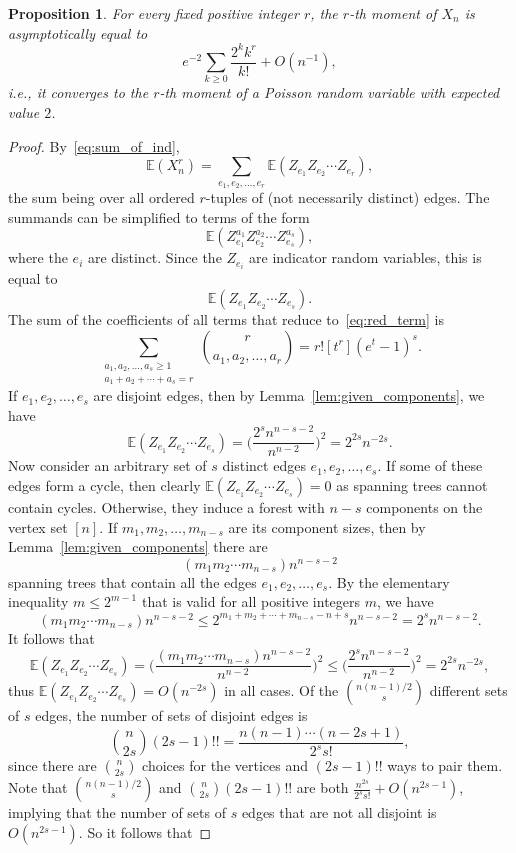 \documentclass[a4paper,12pt,reqno]{amsart}
\newtheorem{proposition}[lemma]{Proposition}
\theoremstyle{remark}
\newcommand{\Ex}{\mathbb{E}}
\begin{document}
\begin{proposition}\label{prop:moments}
For every fixed positive integer $r$, the $r$-th moment of $X_n$ is asymptotically equal to
\[e^{-2} \sum_{k \geq 0} \frac{2^k k^r}{k!} + O(n^{-1}),\]
i.e., it converges to the $r$-th moment of a Poisson random variable with expected value $2$.
\end{proposition}

\begin{proof}
By~\eqref{eq:sum_of_ind},
\[\Ex(X_n^r) = \sum_{e_1,e_2,\ldots,e_r}  \Ex(Z_{e_1}Z_{e_2} \cdots Z_{e_r}),\]
the sum being over all ordered $r$-tuples of (not necessarily distinct) edges. The summands can be simplified to terms of the form
\[\Ex(Z_{e_1}^{a_1} Z_{e_2}^{a_2} \cdots Z_{e_s}^{a_s}),\]
where the $e_i$ are distinct. Since the $Z_{e_i}$ are indicator random variables, this is equal to
\begin{equation}\label{eq:red_term}
\Ex(Z_{e_1}Z_{e_2}\cdots Z_{e_s}).
\end{equation}
The sum of the coefficients of all terms that reduce to~\eqref{eq:red_term} is
\[\sum_{\substack{a_1,a_2,\ldots,a_s \geq 1 \\ a_1 + a_2 + \cdots + a_s = r}} \binom{r}{a_1,a_2,\ldots,a_r}
= r! [t^r] (e^t-1)^s.\]
If $e_1,e_2,\ldots,e_s$ are disjoint edges, then by Lemma~\ref{lem:given_components}, we have
\[\Ex(Z_{e_1}Z_{e_2}\cdots Z_{e_s}) = \Big(\frac{2^s n^{n-s-2}}{n^{n-2}}\Big)^2 = 2^{2s} n^{-2s}.\]
Now consider an arbitrary set of $s$ distinct edges $e_1,e_2,\ldots,e_s$. If some of these edges form a cycle, then clearly $\Ex(Z_{e_1}Z_{e_2}\cdots Z_{e_s}) = 0$ as spanning trees cannot contain cycles. Otherwise, they induce a forest with $n-s$ components on the vertex set $[n]$. If $m_1,m_2,\ldots,m_{n-s}$ are its component sizes, then by Lemma~\ref{lem:given_components} there are
\[(m_1m_2\cdots m_{n-s})n^{n-s-2}\]
spanning trees that contain all the edges $e_1,e_2,\ldots,e_s$. By the elementary inequality $m \leq 2^{m-1}$ that is valid for all positive integers $m$, we have
\[(m_1m_2\cdots m_{n-s})n^{n-s-2} \leq 2^{m_1+m_2+\cdots+m_{n-s}-n+s} n^{n-s-2} = 2^s n^{n-s-2}.\]
It follows that
\[\Ex(Z_{e_1}Z_{e_2}\cdots Z_{e_s}) = 
\Big(\frac{(m_1m_2\cdots m_{n-s})n^{n-s-2}}{n^{n-2}}\Big)^2
\leq \Big(\frac{2^s n^{n-s-2}}{n^{n-2}}\Big)^2 = 2^{2s} n^{-2s},\]
thus $\Ex(Z_{e_1}Z_{e_2}\cdots Z_{e_s}) = O(n^{-2s})$ in all cases.
Of the $\binom{n(n-1)/2}{s}$ different sets of $s$ edges, the number of sets of disjoint edges is
\[\binom{n}{2s} (2s-1)!! = \frac{n(n-1)\cdots (n-2s+1)}{2^s s!},\]
since there are $\binom{n}{2s}$ choices for the vertices and $(2s-1)!!$ ways to pair them. Note that $\binom{n(n-1)/2}{s}$ and $\binom{n}{2s} (2s-1)!!$ are both $\frac{n^{2s}}{2^s s!} + O(n^{2s-1})$, implying that the number of sets of $s$ edges that are not all disjoint is $O(n^{2s-1})$. So it follows that

\end{proof}
\end{document}
